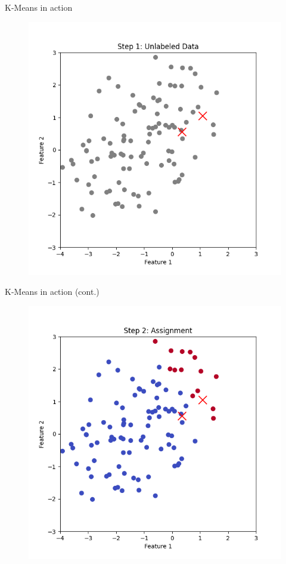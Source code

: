 \documentclass[serif, aspectratio=169]{beamer}
\begin{document}
\begin{frame}{K-Means in action}
    \begin{figure}
        \centering
        \includegraphics[scale=0.45]{pic/figs/kmeans_step_1_unlabeled_data.png}
    \end{figure}
\end{frame}
\begin{frame}{K-Means in action (cont.)}
    \begin{figure}
        \centering
        \includegraphics[scale=0.45]{pic/figs/kmeans_step_2_assignment.png}
    \end{figure}
\end{frame}
\end{document}
